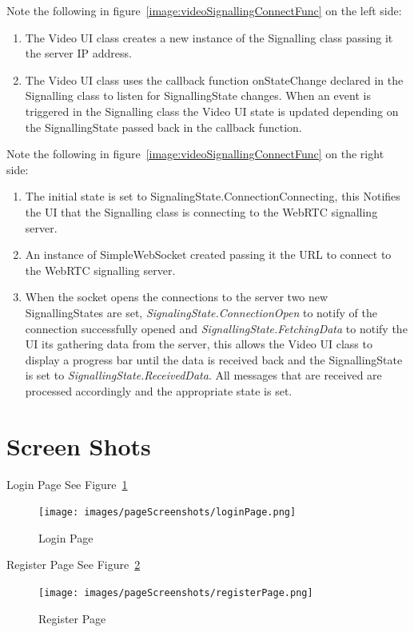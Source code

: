 Note the following in figure~\ref{image:videoSignallingConnectFunc} on the left side:
\begin{enumerate}
	\item The Video UI class creates a new instance of the Signalling class passing it the server IP address.
	\item The Video UI class uses the callback function onStateChange declared in the Signalling class to listen for SignallingState changes. When an event is triggered in the Signalling class the Video UI state is updated depending on the SignallingState passed back in the callback function.
\end{enumerate}

Note the following in figure~\ref{image:videoSignallingConnectFunc} on the right side:
\begin{enumerate}
	\item The initial state is set to SignalingState.ConnectionConnecting, this Notifies the UI that the Signalling class is connecting to the WebRTC signalling server.
	\item An instance of SimpleWebSocket created passing it the URL to connect to the WebRTC signalling server.
    \item When the socket opens the connections to the server two new SignallingStates are set, \textit{SignalingState.ConnectionOpen} to notify of the connection successfully opened and \textit{SignallingState.FetchingData} to notify the UI its gathering data from the server, this allows the Video UI class to display a progress bar until the data is received back and the SignallingState is set to \textit{SignallingState.ReceivedData}. All messages that are received are processed accordingly and the appropriate state is set.
\end{enumerate}

\section{Screen Shots}
Login Page See Figure~\ref{image:loginPage}
\begin{figure}[h!]
    \caption{Login Page}
    \label{image:loginPage}
    \centering
    \texttt{[image: images/pageScreenshots/loginPage.png]}
\end{figure}

Register Page See Figure~\ref{image:registerPage}
\begin{figure}[h!]
    \caption{Register Page}
    \label{image:registerPage}
    \centering
    \texttt{[image: images/pageScreenshots/registerPage.png]}
\end{figure}

